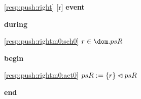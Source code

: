 \noindent \ref{resp:push:right} [r] \textbf{event}
\begin{block}
  \item   \textbf{during}
  \begin{block}
  \item[ \eqref{resp:push:rightm0:sch0} ]{$r \in \dom.psR $} %
  \end{block}
  \item   \textbf{begin}
  \begin{block}
  \item[ \eqref{resp:push:rightm0:act0} ]{$psR \mathrel{:\mkern1mu=} \{r\} \mathbin{\lhd\mkern-14mu-} psR $} %
  \end{block}
  \item   \textbf{end} \\
\end{block}
